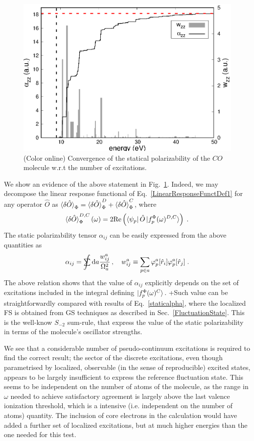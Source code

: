 \documentclass[reprint,aps,prb]{revtex4-1}
\newcommand{\dd}{{\rm d}}
\newcommand{\sint}{\mathrlap{\displaystyle\int}
\mathrlap{\textstyle\sum}
\phantom{\mathrlap{\displaystyle
\int}\textstyle\sum}}
\newcommand{\be}{\begin{equation}}
\newcommand{\ee}{\end{equation}}
\newcommand{\op}[1]{\hat {#1}}
\newcommand{\fscd}[1]{\ket{f_p^\Phi(\omega)^{#1}}}
\begin{document}
\begin{figure}
\includegraphics[scale=0.6]{CO_statPolvsExc.eps}
\caption{\label{co_AlphaExc}(Color online) Convergence of the statical polarizability of the $CO$ molecule w.r.t the number of excitations.}
\end{figure}
We show an evidence of the above statement in Fig.~\ref{co_AlphaExc}. Indeed,
we may decompose the linear response functional of Eq.~\eqref{LinearResponseFunctDef1}
for any operator $\op O$ as $\braket{\delta\op O}_\Phi=\braket{\delta\op O}^D_\Phi +
\braket{\delta\op O}^C_\Phi$, where
\be
\braket{\delta\op O}^{D,C}_\Phi(\omega) = 
2 \mathrm{Re}\left(\bra{\psi_p} \op O \fscd{D,C} \right)\;.
\ee
The static polarizability tensor $\alpha_{ij}$ can be easily expressed
from the above quantities as
\be
\alpha_{ij} = \sint \dd a \frac{w^a_{ij}}{\Omega_a^2}\,, \quad w^a_{ij} \equiv \sum_{p\in a} \varphi_p^a[\op r_i]\varphi_p^a[\op r_j]\;.
\ee
The above relation shows that the value of $\alpha_{ij}$ explicitly depends on the set of excitations
included in the integral defining $\fscd{C}$.
+Such value can be straightforwardly compared with results of Eq.~\eqref{staticalpha}, where the localized FS is obtained from GS techniques as described in Sec.~\ref{FluctuationState}.
This is the well-know $S_{-2}$ sum-rule\cite{TDDFTBOOK}, that express the value of the static polarizability
in terms of the molecule's oscillator strengths.

We see that a considerable number of pseudo-continuum excitations is required
to find the correct result; the sector of the discrete excitations, even though 
parametrised by localized, observable (in the sense of reproducible) excited states,
appears to be largely insufficient to express the reference fluctuation state.
This seems to be independent on the number of atoms of the molecule, as the range in $\omega$ needed to 
achieve satisfactory agreement is largely above the last valence ionization threshold, which is
a intensive (i.e. independent on the number of atoms) quantity.
The inclusion of core electrons in the calculation would have added a further set of localized
excitations, but at much higher energies than the one needed for this test.
\end{document}
